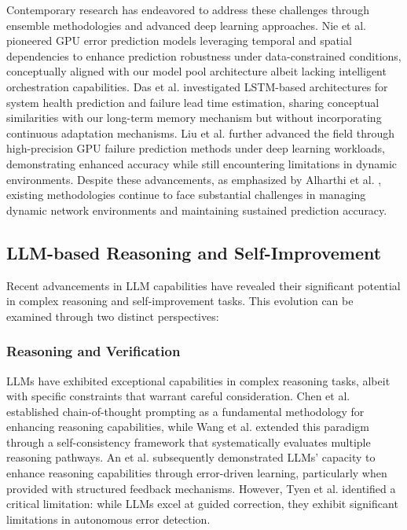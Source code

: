\documentclass[conference]{IEEEtran}
\begin{document}
Contemporary research has endeavored to address these challenges through ensemble methodologies and advanced deep learning approaches. Nie et al. \cite{b10} pioneered GPU error prediction models leveraging temporal and spatial dependencies to enhance prediction robustness under data-constrained conditions, conceptually aligned with our model pool architecture albeit lacking intelligent orchestration capabilities. Das et al. \cite{b5} investigated LSTM-based architectures for system health prediction and failure lead time estimation, sharing conceptual similarities with our long-term memory mechanism but without incorporating continuous adaptation mechanisms. Liu et al. \cite{b8} further advanced the field through high-precision GPU failure prediction methods under deep learning workloads, demonstrating enhanced accuracy while still encountering limitations in dynamic environments. Despite these advancements, as emphasized by Alharthi et al. \cite{b2}, existing methodologies continue to face substantial challenges in managing dynamic network environments and maintaining sustained prediction accuracy.

\subsection{LLM-based Reasoning and Self-Improvement}
Recent advancements in LLM capabilities have revealed their significant potential in complex reasoning and self-improvement tasks. This evolution can be examined through two distinct perspectives:

\subsubsection{Reasoning and Verification}
LLMs have exhibited exceptional capabilities in complex reasoning tasks, albeit with specific constraints that warrant careful consideration. Chen et al. \cite{chen2023} established chain-of-thought prompting as a fundamental methodology for enhancing reasoning capabilities, while Wang et al. \cite{wang2023} extended this paradigm through a self-consistency framework that systematically evaluates multiple reasoning pathways. An et al. \cite{an2024} subsequently demonstrated LLMs' capacity to enhance reasoning capabilities through error-driven learning, particularly when provided with structured feedback mechanisms. However, Tyen et al. \cite{tyen2023} identified a critical limitation: while LLMs excel at guided correction, they exhibit significant limitations in autonomous error detection.
\end{document}
